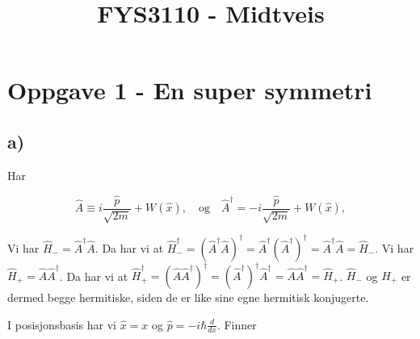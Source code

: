 \documentclass[norsk,a4paper,12pt]{article}
\title{FYS3110 - Midtveis}
\begin{document}
	
\maketitle

\section*{Oppgave 1 - En super symmetri}

\subsection*{a)}

Har

\begin{equation}
	\hat A \equiv i\frac{\hat p}{\sqrt{2m}}+W(\hat x), 
	\quad \text{og} \quad
	\hat A^\dagger = -i\frac{\hat p}{\sqrt{2m}}+W(\hat x),
\end{equation}

Vi har $\hat{H}_- = \hat{A}^\dagger \hat{A}$. Da har vi at $ \hat{H}_-^\dagger = (\hat{A}^\dagger \hat{A})^\dagger = \hat{A}^\dagger (\hat{A}^\dagger)^\dagger = \hat{A}^\dagger \hat{A} = \hat{H}_-$.
Vi har $\hat{H}_+ = \hat{A} \hat{A}^\dagger$. Da har vi at $ \hat{H}_+^\dagger = (\hat{A} \hat{A}^\dagger)^\dagger = (\hat{A}^\dagger)^\dagger \hat{A}^\dagger = \hat{A} \hat{A}^\dagger = \hat{H}_+$.
$\hat{H}_-$ og  $\hat{H}_+$ er dermed begge hermitiske, siden de er like sine egne hermitisk konjugerte.

I posisjonsbasis har vi $\hat{x} = x$ og $\hat{p} = -i\hbar \frac{d}{d x}$. Finner
\end{document}

